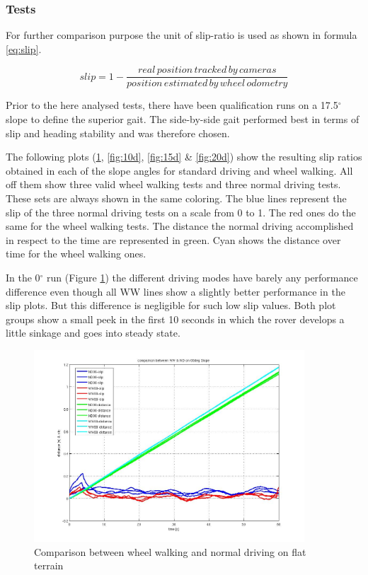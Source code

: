 \documentclass[a4paper,twocolumn]{esapub2005} %
\begin{document}
\subsubsection{Tests}
For further comparison purpose the unit of slip-ratio is used as shown in formula \ref{eq:slip}.

\begin{equation}
    slip = 1- \frac{real\, position\, tracked\, by\, cameras}{position\, estimated\, by\, wheel\, odometry}
		\label{eq:slip}
\end{equation}

Prior to the here analysed tests, there have been qualification runs on a 17.5$^{\circ}$ slope to define the superior gait.
The side-by-side gait performed best in terms of slip and heading stability and was therefore chosen. 


The following plots (\ref{fig:00d}, \ref{fig:10d}, \ref{fig:15d} \& \ref{fig:20d}) show the resulting slip ratios obtained in each of the slope angles for standard driving and wheel walking. All off them show three valid wheel walking tests and three normal driving tests. These sets are always shown in the same coloring. The blue lines represent the slip of the three normal driving tests on a scale from 0 to 1. The red ones do the same for the wheel walking tests. The distance the normal driving accomplished in respect to the time are represented in green. Cyan shows the distance over time for the wheel walking ones.

In the 0$^\circ$ run (Figure \ref{fig:00d}) the different driving modes have barely any performance difference even though all WW lines show a slightly better performance in the slip plots. But this difference is negligible for such low slip values. Both plot groups show a small peek in the first 10 seconds in which the rover develops a little sinkage and goes into steady state. 


\begin{figure}[h!]
	\centering		\includegraphics[width=0.9\textwidth]{00d.JPG}	
	\caption{Comparison between wheel walking and normal driving on flat terrain}
	\label{fig:00d}
\end{figure}
\end{document}
